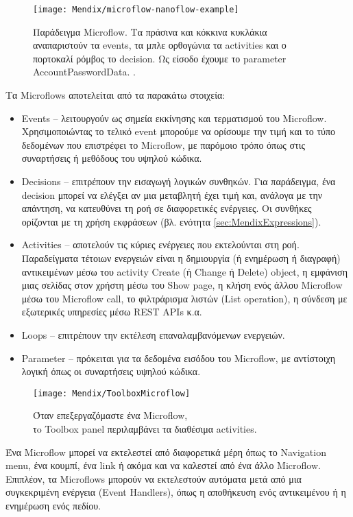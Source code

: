             \begin{figure}[h!] \noindent \centering
                    \texttt{[image: Mendix/microflow-nanoflow-example]}
                    \caption{\centering Παράδειγμα Microflow. Τα πράσινα και κόκκινα κυκλάκια αναπαριστούν τα events, τα μπλε ορθογώνια τα activities και ο πορτοκαλί ρόμβος το decision. Ως είσοδο έχουμε το parameter AccountPasswordData. \cite{mendixDoc}.}
            \end{figure}

            Τα Microflows αποτελείται από τα παρακάτω στοιχεία:
                \begin{itemize}[label={\tiny \blacksquare}]
                    \setlength\itemsep{-0.25em}
                    \item Events -- λειτουργούν ως σημεία εκκίνησης και τερματισμού του Microflow. Χρησιμοποιώντας το τελικό event μπορούμε να ορίσουμε την τιμή και το τύπο δεδομένων που επιστρέφει το Microflow, με παρόμοιο τρόπο όπως στις συναρτήσεις ή μεθόδους του υψηλού κώδικα.
                    \item Decisions -- επιτρέπουν την εισαγωγή λογικών συνθηκών. Για παράδειγμα, ένα decision μπορεί να ελέγξει αν μια μεταβλητή έχει τιμή και, ανάλογα με την απάντηση, να κατευθύνει τη ροή σε διαφορετικές ενέργειες. Οι συνθήκες ορίζονται με τη χρήση εκφράσεων (βλ. ενότητα \ref{sec:MendixExpressions}).
                    \item Activities -- αποτελούν τις κύριες ενέργειες που εκτελούνται στη ροή. Παραδείγματα τέτοιων ενεργειών είναι η δημιουργία (ή ενημέρωση ή διαγραφή) αντικειμένων μέσω του activity Create (ή Change ή Delete) object, η εμφάνιση μιας σελίδας στον χρήστη μέσω του Show page, η κλήση ενός άλλου Microflow μέσω του Microflow call, το φιλτράρισμα λιστών (List operation), η σύνδεση με εξωτερικές υπηρεσίες μέσω REST APIs κ.α.
                    \item Loops --  επιτρέπουν την εκτέλεση επαναλαμβανόμενων ενεργειών.
                    \item Parameter -- πρόκειται για τα δεδομένα εισόδου του Microflow, με αντίστοιχη λογική όπως οι συναρτήσεις υψηλού κώδικα.
                \end{itemize}

            \begin{figure}[h!] \noindent \centering
                    \texttt{[image: Mendix/ToolboxMicroflow]}
                    \caption{\centering Όταν επεξεργαζόμαστε ένα Microflow, \\ τo Toolbox panel περιλαμβάνει τα διαθέσιμα activities.}
            \end{figure}
            Ένα Microflow μπορεί να εκτελεστεί από διαφορετικά μέρη όπως το Navigation menu, ένα κουμπί, ένα link ή ακόμα και να καλεστεί από ένα άλλο Microflow. Επιπλέον, τα Microflows μπορούν να εκτελεστούν αυτόματα μετά από μια συγκεκριμένη ενέργεια (Event Handlers), όπως η αποθήκευση ενός αντικειμένου ή η ενημέρωση ενός πεδίου.

